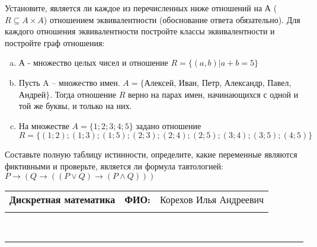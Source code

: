 \documentclass[10pt]{exam}
\newcommand{\class}{Дискретная математика}
\newcommand{\examdate}{}
\begin{document}
\begin{questions}
\question
Установите, является ли каждое из перечисленных ниже отношений на А ($R \subseteq A \times A$) отношением эквивалентности (обоснование ответа обязательно). Для каждого отношения эквивалентности постройте классы 
эквивалентности и постройте граф отношения:
\begin{enumerate} [a)]\setcounter{enumi}{0}
\item А - множество целых чисел и отношение $R = \{(a,b)|a + b = 5\}$
\item Пусть A – множество имен. $A = \{ $Алексей, Иван, Петр, Александр, Павел, Андрей$ \}$. Тогда отношение $R $ верно на парах имен, начинающихся с одной и той же буквы, и только на них.
\item На множестве $A = \{1; 2; 3; 4; 5\}$ задано отношение $R = \{(1; 2); (1; 3); (1; 5); (2; 3); (2; 4); (2; 5); (3; 4); (3; 5); (4; 5)\}$
\end{enumerate}\question Составьте полную таблицу истинности, определите, какие переменные являются фиктивными и проверьте, является ли формула тавтологией:
$ P \rightarrow (Q \rightarrow ((P \lor Q) \rightarrow (P \land Q)))$

\end{questions}
\newpage
\begin{flushright}
\begin{tabular}{p{2.8in} r l}
\textbf{\class} & \textbf{ФИО:} &Корехов Илья Андреевич
\\

\textbf{\examdate} &&\\
\end{tabular}\\
\end{flushright}
\rule[1ex]{\textwidth}{.1pt}
\end{document}
